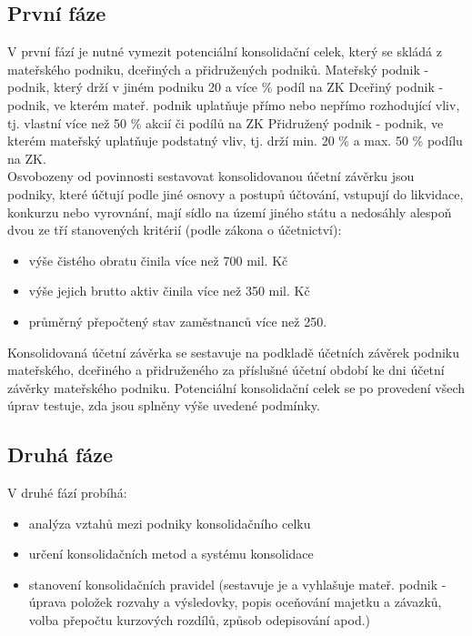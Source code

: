 \documentclass[12pt]{article}
\begin{document}
\subsection{První fáze}
V první fází je nutné vymezit potenciální konsolidační celek, který se skládá z mateřského podniku, dceřiných a přidružených podniků. Mateřský podnik - podnik, který drží v jiném podniku 20 a více \% podíl na ZK Dceřiný podnik - podnik, ve kterém mateř. podnik uplatňuje přímo nebo nepřímo rozhodující vliv, tj. vlastní více než 50 \% akcií či podílů na ZK Přidružený podnik - podnik, ve kterém mateřský uplatňuje podstatný vliv, tj. drží min. 20 \% a max. 50 \% podílu na ZK.
\\

Osvobozeny od povinnosti sestavovat konsolidovanou účetní závěrku jsou podniky, které účtují podle jiné osnovy a postupů účtování, vstupují do likvidace, konkurzu nebo vyrovnání, mají sídlo na území jiného státu a nedosáhly alespoň dvou ze tří stanovených kritérií (podle zákona o účetnictví):

\begin{itemize}

\item výše čistého obratu činila více než 700 mil. Kč
\item výše jejich brutto aktiv činila více než 350 mil. Kč
\item průměrný přepočtený stav zaměstnanců více než 250.

\end{itemize}
Konsolidovaná účetní závěrka se sestavuje na podkladě účetních závěrek podniku mateřského, dceřiného a přidruženého za příslušné účetní období ke dni účetní závěrky mateřského podniku. Potenciální konsolidační celek se po provedení všech úprav testuje, zda jsou splněny výše uvedené podmínky.
\\

\subsection{Druhá fáze}
V druhé fází probíhá:
\begin{itemize}
\item analýza vztahů mezi podniky konsolidačního celku
\item určení konsolidačních metod a systému konsolidace
\item stanovení konsolidačních pravidel (sestavuje je a vyhlašuje mateř. podnik - úprava položek rozvahy a výsledovky, popis oceňování majetku a závazků, volba přepočtu kurzových rozdílů, způsob odepisování apod.)
\end{itemize}
\end{document}
